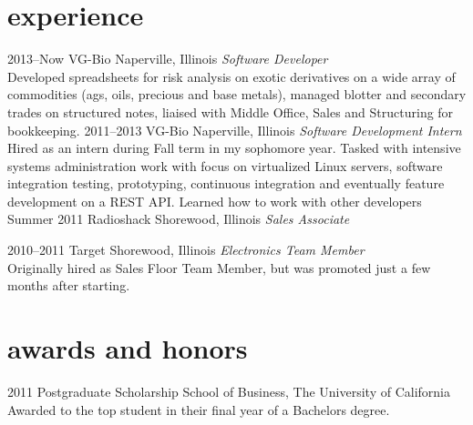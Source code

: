 \documentclass[]{friggeri-cv} %
\begin{document}

\section{experience}

\begin{entrylist}
\entry
{2013--Now}
{VG-Bio}
{Naperville, Illinois}
{\emph{Software Developer} \\
Developed spreadsheets for risk analysis on exotic derivatives on a wide array of commodities (ags, oils, precious and base metals), managed blotter and secondary trades on structured notes, liaised with Middle Office, Sales and Structuring for bookkeeping.}
\entry
{2011--2013}
{VG-Bio}
{Naperville, Illinois}
{\emph{Software Development Intern} \\
Hired as an intern during Fall term in my sophomore year. Tasked with intensive systems administration work with focus on virtualized Linux servers, software integration testing, prototyping, continuous integration and eventually feature development on a REST API. Learned how to work with other developers}
\entry
{Summer 2011}
{Radioshack}
{Shorewood, Illinois}
{\emph{Sales Associate} \\
}

\entry
{2010--2011}
{Target}
{Shorewood, Illinois}
{\emph{Electronics Team Member} \\
Originally hired as Sales Floor Team Member, but was promoted just a few months after starting.}
\end{entrylist}


\section{awards and honors}

\begin{entrylist}
\entry
{2011}
{Postgraduate Scholarship}
{School of Business, The University of California}
{Awarded to the top student in their final year of a Bachelors degree.}
\end{entrylist}
\end{document}
